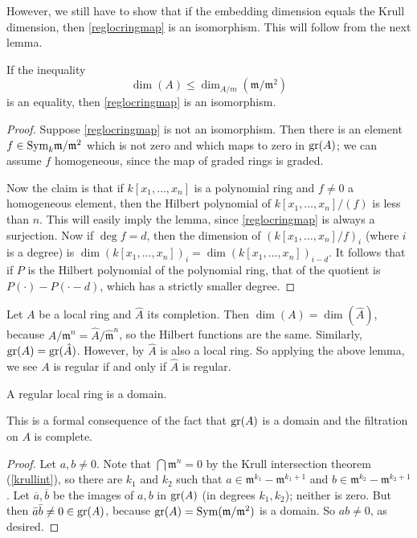 However, we still have to show that if the embedding dimension equals the Krull
dimension, then \eqref{reglocringmap} is an isomorphism. This will follow from
the next lemma.

\begin{lemma} If the inequality \[\dim(A) \leq \dim_{A/m}(\mathfrak{m}/\mathfrak{m}^2)\]
is an equality, then \eqref{reglocringmap} is an isomorphism. 
\end{lemma}
\begin{proof}
Suppose \eqref{reglocringmap} is not an isomorphism. 
Then there is an element $f \in \mathrm{Sym}_k \mathfrak{m}/\mathfrak{m}^2$ which is
not zero and which maps to zero in $\operatorname{gr}(A)$; we can assume $f$ homogeneous,
since the map of graded rings is graded.

Now the claim is that if $k[x_1, \dots, x_n]$ is a polynomial ring and $f \neq
0$ a homogeneous element, then the Hilbert polynomial of $k[x_1, \dots,
x_n]/(f)$ is less than $n$. This will easily imply the lemma, since
\eqref{reglocringmap} is always a surjection. 
Now if $\deg f = d$, then the dimension of $(k[x_1, \dots, x_n]/f)_i$ (where
$i$ is a degree) is $\dim (k[x_1, \dots, x_n])_i = \dim (k[x_1, \dots,
x_n])_{i-d}$. It follows that if $P$ is the Hilbert polynomial of the
polynomial ring, that of the quotient is $P(\cdot) - P(\cdot - d)$, which has a
strictly smaller degree. 
\end{proof}

\begin{remark} Let $A$ be a local ring and $\hat{A}$ its completion. Then $\dim(A)=\dim(\hat{A})$, because $A/\mathfrak{m}^n=\hat{A}/\hat{\mathfrak{m}}^n$, so the Hilbert functions are the same. Similarly, $\operatorname{gr}(A)=\operatorname{gr}(\hat{A})$. However, by  $\hat{A}$ is also a local ring. So applying the above lemma, we see  $A$ is regular if and only if $\hat{A}$ is regular.
\end{remark}


\begin{lemma} A regular local ring is a domain.
\label{reg loc means domain}
\end{lemma}
This is a formal consequence of the fact that $\operatorname{gr}(A)$ is a domain and the
filtration on $A$ is complete.
\begin{proof} Let $a,b \neq 0$. Note that $\bigcap \mathfrak{m}^n=0$ by the
Krull intersection theorem (\cref{krullint}), so there are $k_1$ and $k_2$ such that 
$a \in \mathfrak{m}^{k_1} - \mathfrak{m}^{k_1 + 1}$ and $b \in
\mathfrak{m}^{k_2} - \mathfrak{m}^{k_2 + 1}$.
Let $\overline{a}, \overline{b}$ be the images of $a,b$ in $\operatorname{gr}(A)$ (in
degrees $k_1, k_2$); neither is
zero.
But then $\bar{a}\bar{b} \neq 0 \in \operatorname{gr}(A)$, because $\operatorname{gr}(A)=\mathrm{Sym}(\mathfrak{m}/\mathfrak{m}^2)$ is a domain. So $ab \neq 0$, as desired.
\end{proof}


